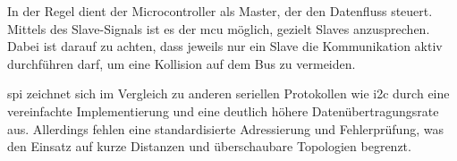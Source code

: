 In der Regel dient der Microcontroller als Master, der den Datenfluss steuert.
Mittels des Slave-Signals ist es der \gls{mcu} möglich, gezielt Slaves anzusprechen.
Dabei ist darauf zu achten, dass jeweils nur ein Slave die Kommunikation aktiv durchführen darf, um eine Kollision auf dem Bus zu vermeiden.

\gls{spi} zeichnet sich im Vergleich zu anderen seriellen Protokollen wie \gls{i2c} durch eine vereinfachte Implementierung und eine deutlich höhere Datenübertragungsrate aus. 
Allerdings fehlen eine standardisierte Adressierung und Fehlerprüfung, was den Einsatz auf kurze Distanzen und überschaubare Topologien begrenzt. 

% 
